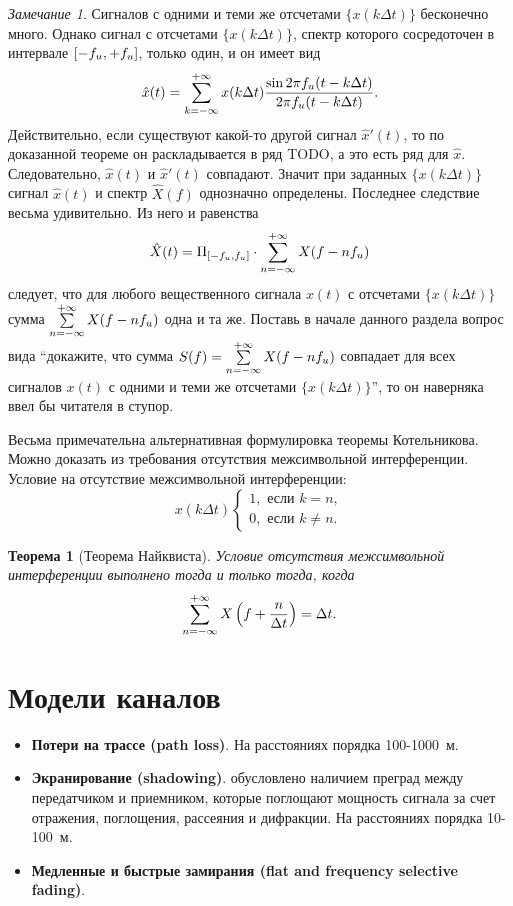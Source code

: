 \documentclass{book}
\newtheorem{theorem}{Теорема}
\numberwithin{theorem}{chapter}
\numberwithin{statement}{chapter}
\numberwithin{lemma}{chapter}
\theoremstyle{definition}
\numberwithin{task}{chapter}
\theoremstyle{remark}
\numberwithin{example}{chapter}
\theoremstyle{definition}
\numberwithin{definition}{chapter}
\theoremstyle{remark}
\newtheorem{note}{Замечание}
\theoremstyle{remark}
\numberwithin{lyrics}{section}
\begin{document}
\begin{note}
Сигналов с одними и теми же отсчетами $\{x(k \Delta t)\}$ бесконечно много. Однако сигнал с отсчетами $\{x(k \Delta t)\}$, спектр которого сосредоточен в интервале $[-f_{u}, +f_{u}]$, только один, и он имеет вид
$$
\hat{x}(t) = \sum\limits_{k=-\infty}^{+\infty} x(k\Delta t) \frac{\sin 2\pi f_{u} (t - k \Delta t)}{2\pi f_{u} (t - k \Delta t)}.
$$
Действительно, если существуют какой-то другой сигнал $\hat{x}'(t)$, то по доказанной теореме он раскладывается в ряд TODO, а это есть ряд для $\hat{x}$. Следовательно, $\hat{x}(t)$ и $\hat{x}'(t)$ совпадают. Значит при заданных $\{x(k \Delta t)\}$ сигнал $\hat{x}(t)$ и спектр $\hat{X}(f)$ однозначно определены. Последнее следствие весьма удивительно. Из него и равенства
$$
\hat{X}(t) = \Pi_{[-f_{u}, f_{u}]} \cdot \sum\limits_{n=-\infty}^{+\infty} X(f - n f_{u})
$$
следует, что для любого вещественного сигнала $x(t)$ с отсчетами $\{x(k \Delta t)\}$ сумма $\sum\limits_{n=-\infty}^{+\infty} X(f - n f_{u})$ одна и та же.
Поставь в начале данного раздела вопрос вида ``докажите, что сумма $S(f) = \sum\limits_{n=-\infty}^{+\infty} X(f - n f_{u})$ совпадает для всех сигналов $x(t)$ с одними и теми же отсчетами $\{x(k \Delta t)\}$'', то он наверняка ввел бы читателя в ступор. 
\end{note}

Весьма примечательна альтернативная формулировка теоремы Котельникова. Можно доказать из требования отсутствия межсимвольной интерференции. Условие на отсутствие межсимвольной интерференции:
\begin{equation}
x(k \Delta t)
\begin{cases}
1, \text{ если } k = n,\\
0, \text{ если } k \neq n.
\end{cases}
\end{equation}
\begin{theorem}[Теорема Найквиста]
Условие отсутствия межсимвольной интерференции выполнено тогда и только тогда, когда 
$$
\sum\limits_{n = -\infty}^{+\infty} X\left(f + \frac{n}{\Delta t}\right) = \Delta t.
$$
\end{theorem}


\chapter{Модели каналов}
\begin{itemize}
\item \textbf{Потери на трассе (path loss)}. На расстояниях порядка 100-1000~м.
\item \textbf{Экранирование (shadowing)}. обусловлено наличием преград между передатчиком и приемником, которые поглощают мощность сигнала за счет отражения, поглощения, рассеяния и дифракции. На расстояниях порядка 10-100~м.
\item \textbf{Медленные и быстрые замирания (flat and frequency selective fading)}.
\end{itemize}
\end{document}
